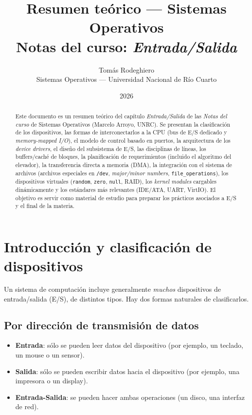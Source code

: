 \documentclass[11pt,a4paper]{article}
\title{
    \vspace{-2.5em}
    \textbf{Resumen teórico --- Sistemas Operativos} \\[0.3em]
    \large Notas del curso: \emph{Entrada/Salida}
}
\author{
    Tomás Rodeghiero \\
    \small Sistemas Operativos --- Universidad Nacional de Río Cuarto
}
\date{2026}
\begin{document}
\maketitle

\begin{abstract}
\noindent
Este documento es un resumen teórico del capítulo \emph{Entrada/Salida}
de las \emph{Notas del curso} de Sistemas Operativos (Marcelo Arroyo,
UNRC). Se presentan la clasificación de los dispositivos, las formas de
interconectarlos a la CPU (bus de E/S dedicado y \emph{memory-mapped
I/O}), el modelo de control basado en puertos, la arquitectura de los
\emph{device drivers}, el diseño del subsistema de E/S, las disciplinas
de líneas, los buffers/caché de bloques, la planificación de
requerimientos (incluido el algoritmo del elevador), la transferencia
directa a memoria (DMA), la integración con el sistema de archivos
(archivos especiales en \texttt{/dev}, \emph{major/minor numbers},
\texttt{file\_operations}), los dispositivos virtuales (\texttt{random},
\texttt{zero}, \texttt{null}, RAID), los \emph{kernel modules}
cargables dinámicamente y los estándares más relevantes (IDE/ATA,
UART, VirtIO). El objetivo es servir como material de estudio para
preparar los prácticos asociados a E/S y el final de la materia.
\end{abstract}

\tableofcontents
\bigskip

\section{Introducción y clasificación de dispositivos}

Un sistema de computación incluye generalmente \emph{muchos} dispositivos
de entrada/salida (E/S), de distintos tipos. Hay dos formas naturales
de clasificarlos.

\subsection{Por dirección de transmisión de datos}

\begin{itemize}[leftmargin=*,nosep]
    \item \textbf{Entrada}: sólo se pueden leer datos del dispositivo
        (por ejemplo, un teclado, un mouse o un sensor).
    \item \textbf{Salida}: sólo se pueden escribir datos hacia el
        dispositivo (por ejemplo, una impresora o un display).
    \item \textbf{Entrada-Salida}: se pueden hacer ambas operaciones
        (un disco, una interfaz de red).
\end{itemize}
\end{document}
